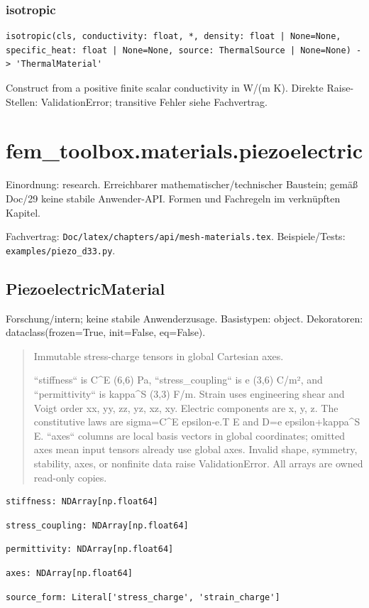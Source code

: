 \subsubsection*{isotropic}
\begin{lstlisting}
isotropic(cls, conductivity: float, *, density: float | None=None, specific_heat: float | None=None, source: ThermalSource | None=None) -> 'ThermalMaterial'
\end{lstlisting}
Construct from a positive finite scalar conductivity in W/(m K).
Direkte Raise-Stellen: ValidationError; transitive Fehler siehe Fachvertrag.
\section{fem\_toolbox.materials.piezoelectric}
Einordnung: research. Erreichbarer mathematischer/technischer Baustein; gemäß Doc/29 keine stabile Anwender-API. Formen und Fachregeln im verknüpften Kapitel.
\par Fachvertrag: \nolinkurl{Doc/latex/chapters/api/mesh-materials.tex}. Beispiele/Tests:
\nolinkurl{examples/piezo_d33.py}.
\subsection{PiezoelectricMaterial}
Forschung/intern; keine stabile Anwenderzusage.
Basistypen: object. Dekoratoren: dataclass(frozen=True, init=False, eq=False).
\begin{quote}
Immutable stress-charge tensors in global Cartesian axes.\par ``stiffness`` is C\textasciicircum{}E (6,6) Pa, ``stress\_coupling`` is e (3,6) C/m², and ``permittivity`` is kappa\textasciicircum{}S (3,3) F/m. Strain uses engineering shear and Voigt order xx, yy, zz, yz, xz, xy. Electric components are x, y, z. The constitutive laws are sigma=C\textasciicircum{}E epsilon-e.T E and D=e epsilon+kappa\textasciicircum{}S E. ``axes`` columns are local basis vectors in global coordinates; omitted axes mean input tensors already use global axes. Invalid shape, symmetry, stability, axes, or nonfinite data raise ValidationError. All arrays are owned read-only copies.
\end{quote}
\begin{lstlisting}
stiffness: NDArray[np.float64]
\end{lstlisting}
\begin{lstlisting}
stress_coupling: NDArray[np.float64]
\end{lstlisting}
\begin{lstlisting}
permittivity: NDArray[np.float64]
\end{lstlisting}
\begin{lstlisting}
axes: NDArray[np.float64]
\end{lstlisting}
\begin{lstlisting}
source_form: Literal['stress_charge', 'strain_charge']
\end{lstlisting}
